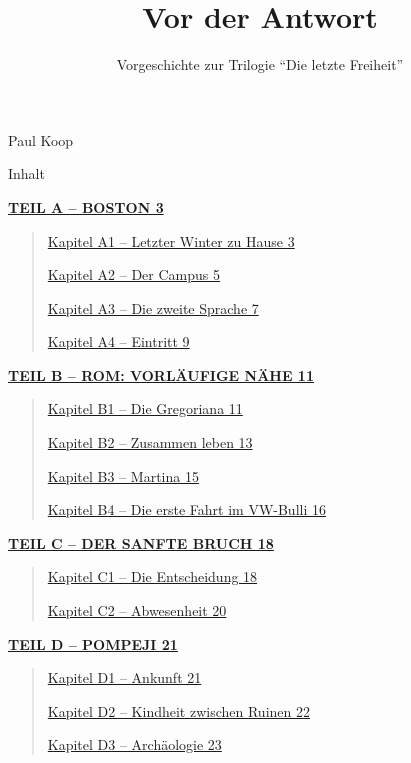 \documentclass[
]{article}
\title{\protect\phantomsection\label{_s0a7ddwuqehv}{}Vor der Antwort}
\subtitle{\protect\phantomsection\label{_o9ks49jgkq76}{}Vorgeschichte zur Trilogie ``Die letzte Freiheit''}
\author{}
\date{}
\begin{document}
\maketitle

{
\setcounter{tocdepth}{3}
\tableofcontents
}
Paul Koop

Inhalt

\hyperref[teil-a-boston]{\textbf{TEIL A -- BOSTON 3}}

\begin{quote}
\hyperref[kapitel-a1-letzter-winter-zu-hause]{Kapitel A1 -- Letzter Winter zu Hause 3}

\hyperref[kapitel-a2-der-campus]{Kapitel A2 -- Der Campus 5}

\hyperref[kapitel-a3-die-zweite-sprache]{Kapitel A3 -- Die zweite Sprache 7}

\hyperref[kapitel-a4-eintritt]{Kapitel A4 -- Eintritt 9}
\end{quote}

\hyperref[teil-b-rom-vorluxe4ufige-nuxe4he]{\textbf{TEIL B -- ROM: VORLÄUFIGE NÄHE 11}}

\begin{quote}
\hyperref[kapitel-b1-die-gregoriana]{Kapitel B1 -- Die Gregoriana 11}

\hyperref[kapitel-b2-zusammen-leben]{Kapitel B2 -- Zusammen leben 13}

\hyperref[kapitel-b3-martina]{Kapitel B3 -- Martina 15}

\hyperref[kapitel-b4-die-erste-fahrt-im-vw-bulli]{Kapitel B4 -- Die erste Fahrt im VW-Bulli 16}
\end{quote}

\hyperref[teil-c-der-sanfte-bruch]{\textbf{TEIL C -- DER SANFTE BRUCH 18}}

\begin{quote}
\hyperref[kapitel-c1-die-entscheidung]{Kapitel C1 -- Die Entscheidung 18}

\hyperref[kapitel-c2-abwesenheit]{Kapitel C2 -- Abwesenheit 20}
\end{quote}

\hyperref[teil-d-pompeji]{\textbf{TEIL D -- POMPEJI 21}}

\begin{quote}
\hyperref[kapitel-d1-ankunft]{Kapitel D1 -- Ankunft 21}

\hyperref[kapitel-d2-kindheit-zwischen-ruinen]{Kapitel D2 -- Kindheit zwischen Ruinen 22}

\hyperref[kapitel-d3-archuxe4ologie]{Kapitel D3 -- Archäologie 23}
\end{quote}
\end{document}
